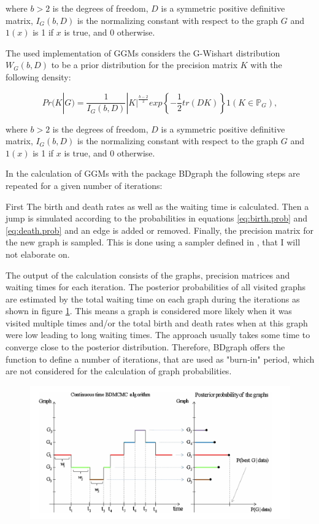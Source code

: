 \documentclass[a4paper,12pt,twoside,openright]{report}
\begin{document}
where $b>2$ is the degrees of freedom, $D$ is a symmetric positive definitive matrix, $I_G(b,D)$ is the normalizing constant with respect to the graph $G$ and $1(x)$ is 1 if $x$ is true, and 0 otherwise.

\newpage
The used implementation of GGMs considers the G-Wishart distribution $W_G(b,D)$ to be a prior distribution for the precision matrix $K$ with the following density:

\begin{equation}
Pr(K|G) = \frac{1}{I_G(b,D)}|K|^{\frac{b-2}{2}}exp\left\lbrace-\frac{1}{2}tr(DK)\right\rbrace 1(K \in \mathbb{P}_G),
\end{equation}

where $b>2$ is the degrees of freedom, $D$ is a symmetric positive definitive matrix, $I_G(b,D)$ is the normalizing constant with respect to the graph $G$ and $1(x)$ is 1 if $x$ is true, and 0 otherwise.

In the calculation of GGMs with the package BDgraph the following steps are repeated for a given number of iterations:

First The birth and death rates as well as the waiting time is calculated. Then a jump is simulated according to the probabilities in equations \ref{eq:birth.prob} and \ref{eq:death.prob} and an edge is added or removed. Finally, the precision matrix for the new graph is sampled. This is done using a sampler defined in \cite{Mohammadi2015}, that I will not elaborate on.  

The output of the calculation consists of the graphs, precision matrices and waiting times for each iteration. The posterior probabilities of all visited graphs are estimated by the total waiting time on each graph during the iterations as shown in figure \ref{fig:bdgraph.waiting.graph}. This means a graph is considered more likely when it was visited multiple times and/or the total birth and death rates when at this graph were low leading to long waiting times. The approach usually takes some time to converge close to the posterior distribution. Therefore, BDgraph offers the function to define a number of iterations, that are used as "burn-in" period, which are not considered for the calculation of graph probabilities.  

\begin{figure}[b!]
\begin{center}
	\includegraphics[scale=1.2, keepaspectratio = true]{../figures/bdgraph_waiting_graph}
	\end{center}
	\caption{}
	\label{fig:bdgraph.waiting.graph}
\end{figure}
\end{document}
